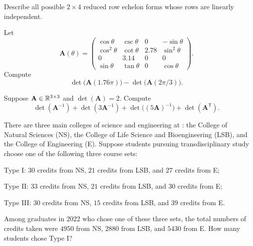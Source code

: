 \begin{problem}
Describe all possible $2\times4$ reduced row echelon forms whose rows are linearly independent.
\end{problem}

\begin{problem}
\begin{problemsubparts}
\item Let
\[
\mathbf A(\theta)=
\begin{pmatrix}
\cos\theta & \csc\theta & 0 & -\sin\theta\\
\cos^2\theta & \cot\theta & 2.78 & \sin^2\theta\\
0 & 3.14 & 0 & 0\\
\sin\theta & \tan\theta & 0 & \cos\theta
\end{pmatrix}.
\]
Compute
\[
\det\bigl(\mathbf A(1.76\pi)\bigr)-\det\bigl(\mathbf A(2\pi/3)\bigr).
\]
\item Suppose $\mathbf A\in\mathbb{R}^{3\times3}$ and $\det(\mathbf A)=2$. Compute
\[
\det(\mathbf A^{-1})+\det(3\mathbf A^{-1})+\det\bigl((5\mathbf A)^{-1}\bigr)+\det(\mathbf A^{\mathsf T}).
\]
\end{problemsubparts}
\end{problem}

\begin{problem}
There are three main colleges of science and engineering at \KAIST{}: the College of Natural Sciences (NS), the College of Life Science and Bioengineering (LSB), and the College of Engineering (E). Suppose students pursuing transdisciplinary study choose one of the following three course sets:
\begin{problemchoices}
\item Type I: $30$ credits from NS, $21$ credits from LSB, and $27$ credits from E;
\item Type II: $33$ credits from NS, $21$ credits from LSB, and $30$ credits from E;
\item Type III: $30$ credits from NS, $15$ credits from LSB, and $39$ credits from E.
\end{problemchoices}
Among graduates in 2022 who chose one of these three sets, the total numbers of credits taken were $4950$ from NS, $2880$ from LSB, and $5430$ from E. How many students chose Type I?
\end{problem}

